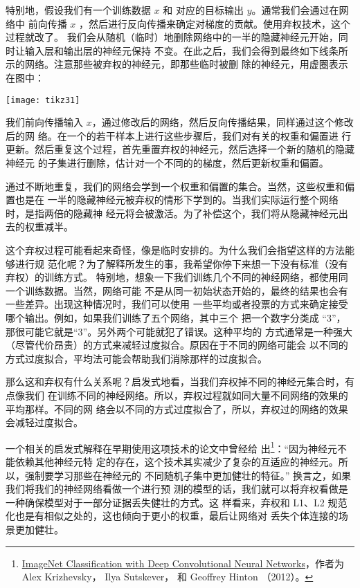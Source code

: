 特别地，假设我们有一个训练数据 $x$ 和 对应的目标输出 $y$。通常我们会通过在网络中
前向传播 $x$ ，然后进行反向传播来确定对梯度的贡献。使用弃权技术，这个过程就改了。
我们会从随机（临时）地删除网络中的一半的隐藏神经元开始，同时让输入层和输出层的神经元保持
不变。在此之后，我们会得到最终如下线条所示的网络。注意那些被弃权的神经元，即那些临时被删
除的神经元，用虚圈表示在图中：
\begin{center}
  \texttt{[image: tikz31]}
\end{center}

我们前向传播输入 $x$，通过修改后的网络，然后反向传播结果，同样通过这个修改后的网
络。在一个的若干样本上进行这些步骤后，我们对有关的权重和偏置进
行更新。然后重复这个过程，首先重置弃权的神经元，然后选择一个新的随机的隐藏神经元
的子集进行删除，估计对一个不同的\minibatch{}的梯度，然后更新权重和偏置。

通过不断地重复，我们的网络会学到一个权重和偏置的集合。当然，这些权重和偏置也是在
一半的隐藏神经元被弃权的情形下学到的。当我们实际运行整个网络时，是指两倍的隐藏神
经元将会被激活。为了补偿这个，我们将从隐藏神经元出去的权重减半。

这个弃权过程可能看起来奇怪，像是临时安排的。为什么我们会指望这样的方法能够进行规
范化呢？为了解释所发生的事，我希望你停下来想一下没有标准（没有弃权）的训练方式。
特别地，想象一下我们训练几个不同的神经网络，都使用同一个训练数据。当然，网络可能
不是从同一初始状态开始的，最终的结果也会有一些差异。出现这种情况时，我们可以使用
一些平均或者投票的方式来确定接受哪个输出。例如，如果我们训练了五个网络，其中三个
把一个数字分类成 “3”，那很可能它就是“3”。另外两个可能就犯了错误。这种平均的
方式通常是一种强大（尽管代价昂贵）的方式来减轻过度拟合。原因在于不同的网络可能会
以不同的方式过度拟合，平均法可能会帮助我们消除那样的过度拟合。

那么这和弃权有什么关系呢？启发式地看，当我们弃权掉不同的神经元集合时，有点像我们
在训练不同的神经网络。所以，弃权过程就如同大量不同网络的效果的平均那样。不同的网
络会以不同的方式过度拟合了，所以，弃权过的网络的效果会减轻过度拟合。

一个相关的启发式解释\label{dropout_explanation}在早期使用这项技术的论文中曾经给
出\footnote{\href{https://papers.nips.cc/paper/4824-imagenet-classification-with-deep-convolutional-neural-networks.pdf}{ImageNet
    Classification with Deep Convolutional Neural Networks}，作者为 Alex Krizhevsky，
  Ilya Sutskever， 和 Geoffrey Hinton （2012）。}：“因为神经元不能依赖其他神经元特
定的存在，这个技术其实减少了复杂的互适应的神经元。所以，强制要学习那些在神经元的
不同随机子集中更加健壮的特征。” 换言之，如果我们将我们的神经网络看做一个进行预
测的模型的话，我们就可以将弃权看做是一种确保模型对于一部分证据丢失健壮的方式。这
样看来，弃权和 L1、L2 规范化也是有相似之处的，这也倾向于更小的权重，最后让网络对
丢失个体连接的场景更加健壮。

